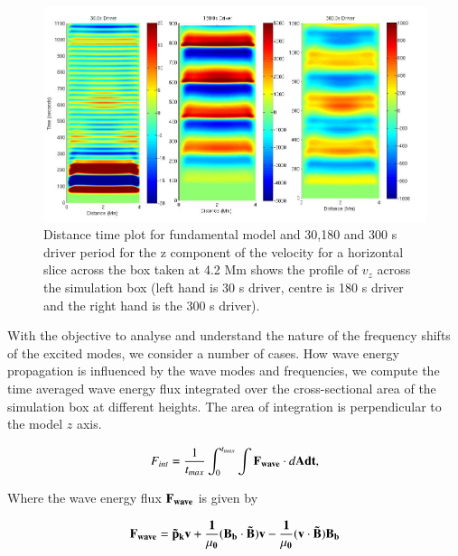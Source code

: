 \documentclass[authoryear,final,1p]{elsarticle}
\begin{document}

\begin{figure}[h]
\includegraphics[scale=0.4]{images/fig7_dt_30_180_300_0_horiz_4p2Mm.jpg}
\caption{Distance time plot for fundamental model and 30,180 and 300 s driver period for the z component of the velocity for a horizontal slice across the box  taken at 4.2 Mm shows  the profile of $v_{z}$ across the simulation box (left hand is 30 s driver, centre is 180 s driver and the right hand is the 300 s driver). }
\label{Fig6}
\end{figure}
With the objective to analyse and understand the nature of the frequency shifts of the excited modes, we consider a number of cases.  How wave energy propagation is influenced by the wave modes and frequencies, we compute the time averaged wave energy flux integrated over the cross-sectional area of the simulation box at different heights. The area of integration is perpendicular to the model $z$ axis.

\begin{equation}\label{eqwaveenergyfluxintegral}
F_{int}= \frac{1}{t_{max}} \int_{0}^{t_{max}} \int         {\bf{F}_{wave}} \cdot d\bf{A}   dt   ,
\end{equation}

Where the wave energy flux $\bf{F}_{wave}$ is given by

\begin{equation}\label{eqwaveenergyflux}
\bf{F_{wave}}=\tilde{p}_{k} \bf{v}+\frac{1}{\mu_{0}}(\bf{B_{b}}\cdot \bf{\tilde{B}})\bf{v}-\frac{1}{\mu_{0}}(\bf{v}\cdot\bf{\tilde{B}})\bf{B_{b}}
\end{equation}
\end{document}
